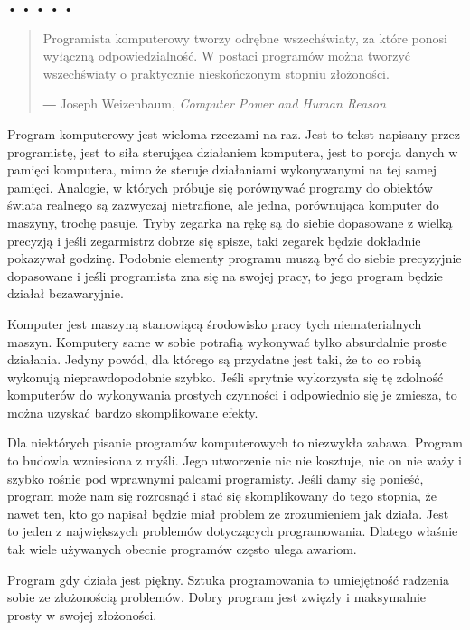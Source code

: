 \begin{center}
• • • • •
\end{center}

  
\begin{quotation}
Programista komputerowy tworzy odrębne wszechświaty, za które ponosi wyłączną odpowiedzialność. W postaci programów można tworzyć wszechświaty o praktycznie nieskończonym stopniu złożoności.
    
    ― Joseph Weizenbaum, \emph{Computer Power and Human Reason}
\end{quotation}
  
Program komputerowy jest wieloma rzeczami na raz. Jest to tekst napisany przez programistę, jest to siła sterująca działaniem komputera, jest to porcja danych w pamięci komputera, mimo że steruje działaniami wykonywanymi na tej samej pamięci. Analogie, w których próbuje się porównywać programy do obiektów świata realnego są zazwyczaj nietrafione, ale jedna, porównująca komputer do maszyny, trochę pasuje. Tryby zegarka na rękę są do siebie dopasowane z wielką precyzją i jeśli zegarmistrz dobrze się spisze, taki zegarek będzie dokładnie pokazywał godzinę. Podobnie elementy programu muszą być do siebie precyzyjnie dopasowane i jeśli programista zna się na swojej pracy, to jego program będzie działał bezawaryjnie.

  
Komputer jest maszyną stanowiącą środowisko pracy tych niematerialnych maszyn. Komputery same w sobie potrafią wykonywać tylko absurdalnie proste działania. Jedyny powód, dla którego są przydatne jest taki, że to co robią wykonują nieprawdopodobnie szybko. Jeśli sprytnie wykorzysta się tę zdolność komputerów do wykonywania prostych czynności i odpowiednio się je zmiesza, to można uzyskać bardzo skomplikowane efekty.

  
Dla niektórych pisanie programów komputerowych to niezwykła zabawa. Program to budowla wzniesiona z myśli. Jego utworzenie nic nie kosztuje, nic on nie waży i szybko rośnie pod wprawnymi palcami programisty. Jeśli damy się ponieść, program może nam się rozrosnąć i stać się skomplikowany do tego stopnia, że nawet ten, kto go napisał będzie miał problem ze zrozumieniem jak działa. Jest to jeden z największych problemów dotyczących programowania. Dlatego właśnie tak wiele używanych obecnie programów często ulega awariom.

  
Program gdy działa jest piękny. Sztuka programowania to umiejętność radzenia sobie ze złożonością problemów. Dobry program jest zwięzły i maksymalnie prosty w swojej złożoności.


